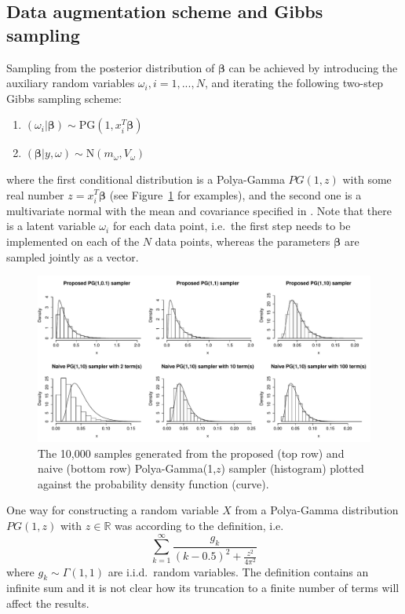 \documentclass[a4paper]{article}\usepackage[]{graphicx}\usepackage[]{color}
\newcommand{\boldbeta}{\boldsymbol{\beta}}
\newcommand{\PG}{\text{PG}}
\newcommand{\N}{\text{N}}
\begin{document}
\subsection{Data augmentation scheme and Gibbs sampling}
 Sampling from the posterior distribution of $\boldbeta$ can be achieved by introducing the auxiliary random variables $\omega_i, i=1, ..., N$, and iterating the following two-step Gibbs sampling scheme:

\begin{enumerate}
\item $(\omega_i | \boldbeta) \sim \PG(1, x_i^T \boldbeta)$
\item $(\boldbeta | y, \omega) \sim \N(m_\omega, V_\omega)$
\end{enumerate}

where the first conditional distribution is a Polya-Gamma $PG(1, z)$ with some real number $z = x_i^T \boldbeta$ (see Figure~\ref{fig:proposed_naive} for examples), and the second one is a multivariate normal with the mean and covariance specified in \cite{polson2013bayesian}.
Note that there is a latent variable $\omega_i$ for each data point, i.e.~the first step needs to be implemented on each of the $N$ data points, whereas the parameters $\boldbeta$ are sampled jointly as a vector.

\begin{figure}[ht]
\centering
\centerline{\includegraphics[width=1\textwidth]{proposed_naive}}
\caption{The 10,000 samples generated from the proposed (top row) and naive (bottom row) Polya-Gamma(1,$z$) sampler (histogram) plotted against the probability density function (curve).}
\label{fig:proposed_naive}
\end{figure}


One way for constructing a random variable $X$ from a Polya-Gamma distribution $PG(1, z)$ with $z \in \mathbb{R}$ was according to the definition, i.e.
\begin{equation} \label{PGdef}
\sum_{k=1}^\infty \frac{g_k}{(k-0.5)^2 + \frac{z^2}{4 \pi^2}}
\end{equation}
where $g_k \sim \Gamma(1, 1)$ are i.i.d.~random variables. The definition contains an infinite sum and it is not clear how its truncation to a finite number of terms will affect the results.
\end{document}
